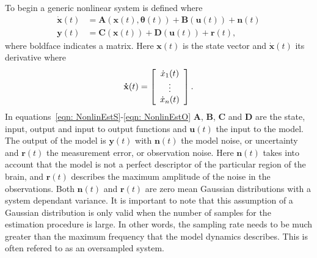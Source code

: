 To begin a generic nonlinear system is defined where \begin{align}
\label{eqn: NonlinEstS}
\mathbf{\dot{x}}(t) &= \mathbf{A}(\mathbf{x}(t),\mathbf{\theta}(t)) + \mathbf{B}(\mathbf{u}(t)) + \mathbf{n}(t)\\
\label{eqn: NonlinEstO}
\mathbf{y}(t)  &= \mathbf{C}(\mathbf{x}(t)) +\mathbf{D}(\mathbf{u}(t))+\mathbf{r}(t),
\end{align} where boldface indicates a matrix. Here $\mathbf{x}(t)$ is the state vector and $\dot{\mathbf{x}}(t)$ its derivative where
\[ \mathbf{\dot{x}}(t) = \left[ \begin{array}[pos]{c}
\dot{x}_{1}(t)\\
\vdots \\
\dot{x}_{n}(t) \end{array} \right] .\]  In equations~\ref{eqn: NonlinEstS}-\ref{eqn: NonlinEstO} $\mathbf{A}$, $\mathbf{B}$, $\mathbf{C}$ and $\mathbf{D}$ are the state, input, output and input to output functions and $\mathbf{u}(t)$ the input to the model. The output of the model is $\mathbf{y}(t)$ with $\mathbf{n}(t)$ the model noise, or uncertainty and $\mathbf{r}(t)$ the measurement error, or observation noise. Here $\mathbf{n}(t)$ takes into account that the model is not a perfect descriptor of the particular region of the brain, and $\mathbf{r}(t)$ describes the maximum amplitude of the noise in the observations. Both $\mathbf{n}(t)$ and $\mathbf{r}(t)$ are zero mean Gaussian distributions with a system dependant variance. It is important to note that this assumption of a Gaussian distribution is only valid when the number of samples for the estimation procedure is large. In other words, the sampling rate needs to be much greater than the maximum frequency that the model dynamics describes. This is often refered to as an oversampled system.

